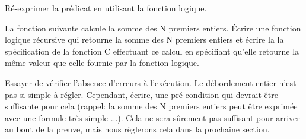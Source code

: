 

Ré-exprimer la prédicat  en utilisant la fonction logique.



\label{l4:acsl-properties-functions-n-first-ints}


La fonction suivante calcule la somme des N premiers entiers. Écrire une fonction
logique récursive qui retourne la somme des N premiers entiers et écrire la
la spécification de la fonction C effectuant ce calcul en spécifiant qu'elle
retourne la même valeur que celle fournie par la fonction logique.




Essayer de vérifier l'absence d'erreurs à l'exécution. Le débordement entier
n'est pas si simple à régler. Cependant, écrire, une pré-condition qui devrait
être suffisante pour cela (rappel: la somme des N premiers entiers peut être
exprimée avec une formule très simple ...). Cela ne sera sûrement pas suffisant
pour arriver au bout de la preuve, mais nous règlerons cela dans la prochaine
section.